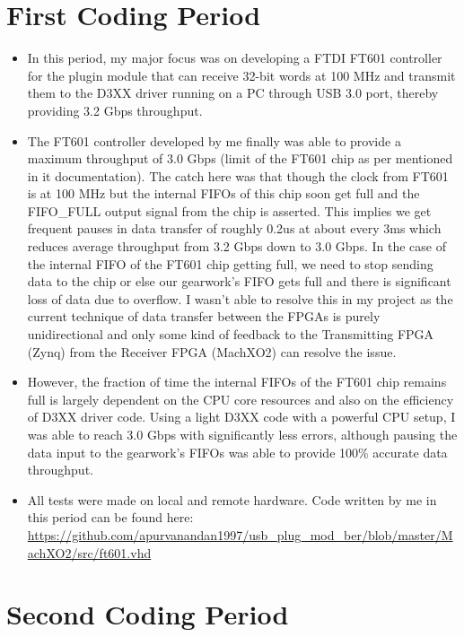 \documentclass[11pt,oneside,fleqn]{book} %
\begin{document}
\section{First Coding Period}
\begin{itemize}
\item In this period, my major focus was on developing a FTDI FT601 controller for the plugin module that can receive 32-bit words at 100 MHz and transmit them to the D3XX driver running on a PC through USB 3.0 port, thereby providing 3.2 Gbps throughput.
\item The FT601 controller developed by me finally was able to provide a maximum throughput of 3.0 Gbps (limit of the FT601 chip  as per mentioned in it documentation). The catch here was that though the clock from FT601 is at 100 MHz but the internal FIFOs of this chip soon get full and the FIFO\_FULL output signal from the chip is asserted. This implies we get frequent pauses in data transfer of roughly 0.2us at about every 3ms which reduces average throughput from 3.2 Gbps down to 3.0 Gbps. In the case of the internal FIFO of the FT601 chip getting full, we need to stop sending data to the chip or else our gearwork's FIFO gets full and there is significant loss of data due to overflow. I wasn't able to resolve this in my project as the current technique of data transfer between the FPGAs is purely unidirectional and only some kind of feedback to the Transmitting FPGA (Zynq) from the Receiver FPGA (MachXO2) can resolve the issue. 
\item However, the fraction of time the internal FIFOs of the FT601 chip remains full is largely dependent on the CPU core resources and also on the efficiency of D3XX driver code. Using a light D3XX code with a powerful CPU setup, I was able to reach 3.0 Gbps with significantly less errors, although pausing the data input to the gearwork's FIFOs was able to provide 100\% accurate data throughput.
\item All tests were made on local and remote hardware. Code written by me in this period can be found here:\\ \textcolor{blue}{\url{https://github.com/apurvanandan1997/usb_plug_mod_ber/blob/master/MachXO2/src/ft601.vhd}}
\end{itemize}

\section{Second Coding Period}
\end{document}
